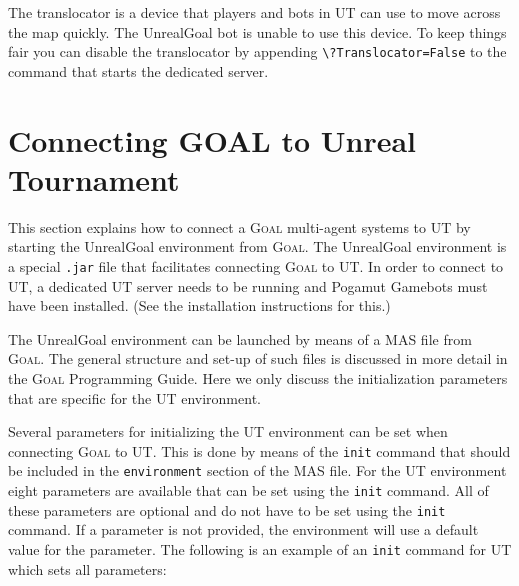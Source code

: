 \documentclass[11pt,a4paper]{article}
\newcommand{\Goal}{\textsc{Goal}}
\begin{document}
The translocator is a device that players and bots in UT can use to move across the map quickly. The UnrealGoal bot is unable to use this device. To keep things fair you can disable the translocator by appending \verb|\?Translocator=False| to the command that starts the dedicated server.

%
%
%
\section{Connecting GOAL to Unreal Tournament}\label{sec:masspec}
%

This section explains how to connect a {\Goal} multi-agent systems to UT by starting the UnrealGoal environment from {\Goal}. The UnrealGoal environment is a special \texttt{.jar} file that facilitates connecting {\Goal} to UT. In order to connect to UT, a dedicated UT server needs to be running and Pogamut Gamebots must have been installed. (See the installation instructions for this.) %

The UnrealGoal environment can be launched by means of a MAS file from {\Goal}. The general structure and set-up of such files is discussed in more detail in the {\Goal} Programming Guide. Here we only discuss the initialization parameters that are specific for the UT environment.


Several parameters for initializing the UT environment can be set when connecting {\Goal} to UT. This is done by means of the \texttt{init} command that should be included in the \texttt{environment} section of the MAS file. For the UT environment eight parameters are available that can be set using the \texttt{init} command. All of these parameters are optional and do not have to be set using the \texttt{init} command. If a parameter is not provided, the environment will use a default value for the parameter. The following is an example of an \texttt{init} command for UT which sets all parameters:
\end{document}
